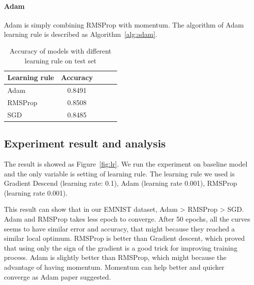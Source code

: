 \documentclass{article}
\begin{document}
\paragraph{Adam} Adam \citep{DBLP:journals/corr/KingmaB14} is simply combining RMSProp with momentum.  The algorithm of Adam learning rule is described as Algorithm~\ref{alg:adam}.

 


\begin{table}[tb]
\vskip 3mm
\begin{center}
\begin{small}
\begin{sc}
\begin{tabular}{lcccr}
\hline
\abovespace\belowspace
Learning rule & Accuracy \\
\hline
\abovespace
Adam    	& 0.8491 	\\
RMSProp	 	& 0.8508 	\\
SGD			& 0.8485 	\\

\hline
\end{tabular}
\end{sc}
\end{small}
\caption{Accuracy of models with different learning rule on test set}
\label{tab:lr}
\end{center}
\vskip -3mm
\end{table}





\subsection{Experiment result and analysis}
The result is showed as Figure~\ref{fig:lr}. We run the experiment on baseline model and the only variable is setting of learning rule. The learning rule we used is Gradient Descend (learning rate: 0.1), Adam (learning rate 0.001), RMSProp (learning rate 0.001).

 This result can show that in our EMNIST dataset,  Adam > RMSProp > SGD. Adam and RMSProp takes less epoch to converge. After 50 epochs, all the curves seems to have similar error and accuracy, that might because they reached a similar local optimum. RMSProp is better than Gradient descent, which proved that using only the sign of the gradient is a good trick for improving training process. Adam is slightly better than RMSProp, which might because the advantage of having momentum. Momentum can help better and quicker converge as Adam paper suggested.
\end{document}
